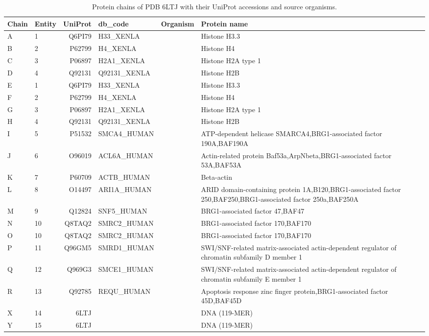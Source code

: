 \begin{table}[htbp]
  \centering\small
  \begin{tabular}{@{}llrllp{6.5cm}@{}}
    \toprule
    Chain & Entity & \multicolumn{1}{c}{UniProt} & db\_code & Organism & Protein name \\
    \midrule
    A & 1 & Q6PI79 & H33_XENLA &  & Histone H3.3 \\
    B & 2 & P62799 & H4_XENLA &  & Histone H4 \\
    C & 3 & P06897 & H2A1_XENLA &  & Histone H2A type 1 \\
    D & 4 & Q92131 & Q92131_XENLA &  & Histone H2B \\
    E & 1 & Q6PI79 & H33_XENLA &  & Histone H3.3 \\
    F & 2 & P62799 & H4_XENLA &  & Histone H4 \\
    G & 3 & P06897 & H2A1_XENLA &  & Histone H2A type 1 \\
    H & 4 & Q92131 & Q92131_XENLA &  & Histone H2B \\
    I & 5 & P51532 & SMCA4_HUMAN &  & ATP-dependent helicase SMARCA4,BRG1-associated factor 190A,BAF190A \\
    J & 6 & O96019 & ACL6A_HUMAN &  & Actin-related protein Baf53a,ArpNbeta,BRG1-associated factor 53A,BAF53A \\
    K & 7 & P60709 & ACTB_HUMAN &  & Beta-actin \\
    L & 8 & O14497 & ARI1A_HUMAN &  & ARID domain-containing protein 1A,B120,BRG1-associated factor 250,BAF250,BRG1-associated factor 250a,BAF250A \\
    M & 9 & Q12824 & SNF5_HUMAN &  & BRG1-associated factor 47,BAF47 \\
    N & 10 & Q8TAQ2 & SMRC2_HUMAN &  & BRG1-associated factor 170,BAF170 \\
    O & 10 & Q8TAQ2 & SMRC2_HUMAN &  & BRG1-associated factor 170,BAF170 \\
    P & 11 & Q96GM5 & SMRD1_HUMAN &  & SWI/SNF-related matrix-associated actin-dependent regulator of chromatin subfamily D member 1 \\
    Q & 12 & Q969G3 & SMCE1_HUMAN &  & SWI/SNF-related matrix-associated actin-dependent regulator of chromatin subfamily E member 1 \\
    R & 13 & Q92785 & REQU_HUMAN &  & Apoptosis response zinc finger protein,BRG1-associated factor 45D,BAF45D \\
    X & 14 & 6LTJ &  &  & DNA (119-MER) \\
    Y & 15 & 6LTJ &  &  & DNA (119-MER) \\
    \bottomrule
  \end{tabular}
  \caption{Protein chains of PDB 6LTJ with their UniProt accessions and source organisms.}
  \label{tab:6ltj_chains_uniprot}
\end{table}
